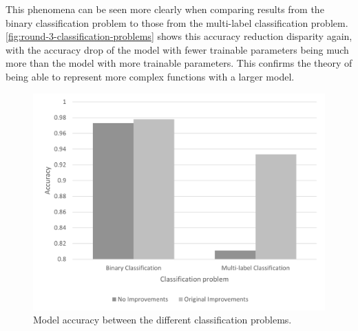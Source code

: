 This phenomena can be seen more clearly when comparing results from the binary classification problem to those from the multi-label classification problem. \autoref{fig:round-3-classification-problems} shows this accuracy reduction disparity again, with the accuracy drop of the model with fewer trainable parameters being much more than the model with more trainable parameters. This confirms the theory of being able to represent more complex functions with a larger model.

\begin{figure}[H]
    \centering
    \includegraphics[width=\textwidth]{figures/round-3-classification-problems.png}
    \caption{Model accuracy between the different classification problems.}
    \label{fig:round-3-classification-problems}
\end{figure}